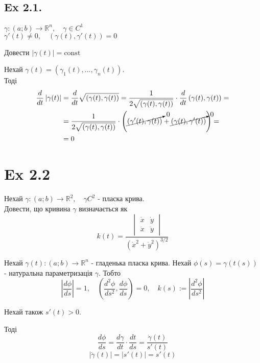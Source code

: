 \documentclass[10pt, a4paper]{article} %
\newcommand{\R}{\mathbb{R}}
\begin{document}
\subsection*{Ex 2.1.}
\begin{mdframed}
    $\gamma : (a;b) \to \R^n, \quad \gamma \in C^1$\\
    $\gamma'(t) \ne 0, \quad \left(\gamma(t), \gamma'(t)\right) = 0$

    Довести
    $\left|\gamma(t)\right| = \text{const}$
\end{mdframed}

Нехай $\gamma(t) = (\gamma_1(t), ..., \gamma_n(t))$.\\
Тоді
\begin{align*}
    \frac{d}{dt} \left|\gamma(t)\right| &= \frac{d}{dt} \sqrt{\left(\gamma(t), \gamma(t)\right)} = 
    \frac{1}{2\sqrt{\left(\gamma(t), \gamma(t)\right)}} \cdot \frac{d}{dt}\left(\gamma(t), \gamma(t)\right) = \\
    &= \frac{1}{2\sqrt{\left(\gamma(t), \gamma(t)\right)}} \cdot \left(\cancelto{0}{(\gamma'(t), \gamma(t))} + \cancelto{0}{(\gamma(t), \gamma'(t))}\right) = \\
    &= 0
\end{align*}


\section*{Ex 2.2}
\begin{mdframed}
    Нехай $\gamma : (a;b) \to \R^2, \quad \gamma C^2$ - пласка крива.\\
    Довести, що кривина $\gamma$ визначається як 
    \[k(t) = \frac{\begin{vmatrix}
        \dot x & \dot y \\ \ddot x & \ddot y
    \end{vmatrix}}{(\dot x^2 + \dot y^2)^{3/2}}\]
\end{mdframed}

Нехай $\gamma(t) : (a;b) \to \R^n$ - гладенька пласка крива.
Нехай $\phi(s) = \gamma(t(s))$ - натуральна параметризація $\gamma$. 
Тобто
\[|\frac{d\phi}{ds}| = 1, \quad (\frac{d^2\phi}{ds^2}, \frac{d\phi}{ds}) = 0, \quad k(s) := \left|\frac{d^2\phi}{ds^2}\right|\]

Нехай також $s'(t) > 0$.

Тоді 
\[\frac{d\phi}{ds} = \frac{d\gamma}{dt} \cdot \frac{dt}{ds} = \frac{\dot \gamma(t)}{s'(t)}\]
\begin{equation*}\label{eqn:2.2.1}
    |\dot \gamma(t)| = |s'(t)| = s'(t)
\end{equation*}
\end{document}
